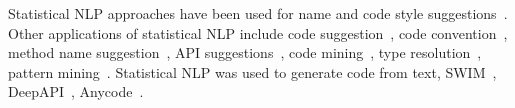 %
Statistical NLP approaches have been used for name and code style
suggestions~\cite{sutton-fse15,barr-codeconvention-fse14}.
%
%
Other applications of statistical NLP include code
suggestion~\cite{hindle-icse12,tbcnn14}, code
convention~\cite{barr-codeconvention-fse14}, method name
suggestion~\cite{sutton-fse15}, API suggestions~\cite{raychev-pldi14},
code mining~\cite{sutton-msr13}, type resolution~\cite{icse18}, pattern mining~\cite{sutton-16}.
Statistical NLP was used to generate code from text, \eg
SWIM~\cite{Raghothaman-ICSE16}, DeepAPI~\cite{gu-fse16},
Anycode~\cite{anycode-oopsla15}.

